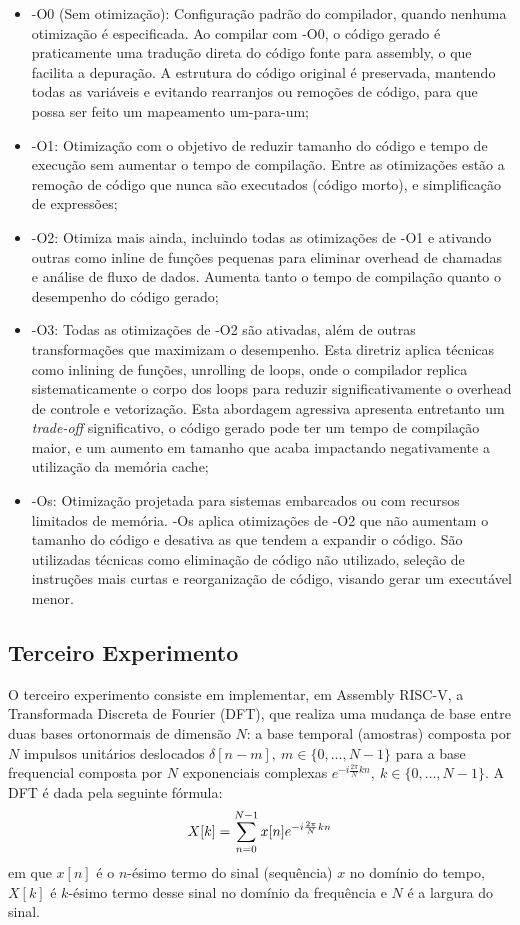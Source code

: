 \documentclass[a4paper,12pt]{article}
\begin{document}
\begin{itemize}
    \item -O0 (Sem otimização): Configuração padrão do compilador, quando nenhuma otimização é especificada. Ao compilar com -O0, o código gerado é praticamente uma tradução direta do código fonte para assembly, o que facilita a depuração. A estrutura do código original é preservada, mantendo todas as variáveis e evitando rearranjos ou remoções de código, para que possa ser feito um mapeamento um-para-um;
    \item -O1: Otimização com o objetivo de reduzir tamanho do código e tempo de execução sem aumentar o tempo de compilação. Entre as otimizações estão a remoção de código que nunca são executados (código morto), e simplificação de expressões;
    \item -O2: Otimiza mais ainda, incluindo todas as otimizações de -O1 e ativando outras como inline de funções pequenas para eliminar overhead de chamadas e análise de fluxo de dados. Aumenta tanto o tempo de compilação quanto o desempenho do código gerado;
    \item -O3: Todas as otimizações de -O2 são ativadas, além de outras transformações que maximizam o desempenho. Esta diretriz aplica técnicas como inlining de funções, unrolling de loops, onde o compilador replica sistematicamente o corpo dos loops para reduzir significativamente o overhead de controle e vetorização. Esta abordagem agressiva apresenta entretanto um \textit{trade-off} significativo, o código gerado pode ter um tempo de compilação maior, e um aumento em tamanho que acaba impactando negativamente a utilização da memória cache;
    \item -Os: Otimização projetada para sistemas embarcados ou com recursos limitados de memória. -Os aplica otimizações de -O2 que não aumentam o tamanho do código e desativa as que tendem a expandir o código. São utilizadas técnicas como eliminação de código não utilizado, seleção de instruções mais curtas e reorganização de código, visando gerar um executável menor.
\end{itemize}

\newpage

\subsection{Terceiro Experimento}
O terceiro experimento consiste em implementar, em Assembly RISC-V, a Transformada Discreta de Fourier (DFT), que realiza uma mudança de base entre duas bases ortonormais de dimensão $N$: a base temporal (amostras) composta por $N$ impulsos unitários deslocados $\delta[n-m],\ m \in \{0, \dots, N-1\}$ para a base frequencial composta por $N$ exponenciais complexas $e^{-i\frac{2\pi}{N}kn},\ k \in \{0, \dots, N-1\}$. A DFT é dada pela seguinte fórmula:
\vspace{-10pt}
\begin{equation}
    X[k] = \sum_{n=0}^{N-1} x[n]e^{-i\frac{2\pi}{N}kn}
    \vspace{-8pt}
\end{equation}
em que $x[n]$ é o $n$-ésimo termo do sinal (sequência) $x$ no domínio do tempo, $X[k]$ é $k$-ésimo termo desse sinal no domínio da frequência e $N$ é a largura do sinal.
\end{document}
